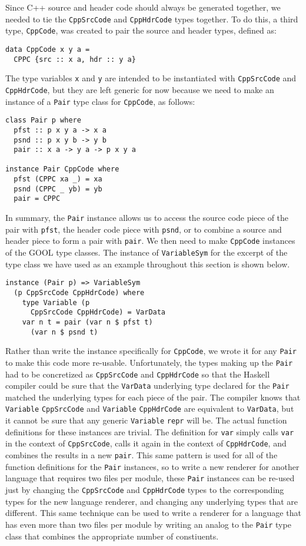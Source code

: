 \documentclass[sigplan,review,anonymous]{acmart}
\begin{document}
Since C++ source and header code should always be generated together, we needed 
to tie the \verb|CppSrcCode| and \verb|CppHdrCode| types together. To do this, 
a third type, \verb|CppCode|, was created to pair the source and header types, 
defined as:
\begin{lstlisting}
data CppCode x y a = 
  CPPC {src :: x a, hdr :: y a}
\end{lstlisting}
The type variables \verb|x| and \verb|y| are intended to be instantiated with 
\verb|CppSrcCode| and \verb|CppHdrCode|, but they are left generic for now 
because we need to make an instance of a \verb|Pair| type class for 
\verb|CppCode|, as follows:
\begin{lstlisting}
class Pair p where
  pfst :: p x y a -> x a
  psnd :: p x y b -> y b
  pair :: x a -> y a -> p x y a
  
instance Pair CppCode where
  pfst (CPPC xa _) = xa
  psnd (CPPC _ yb) = yb
  pair = CPPC
\end{lstlisting}
In summary, the \verb|Pair| instance allows us to access the source code piece 
of the pair with \verb|pfst|, the header code piece with \verb|psnd|, or to 
combine a source and header piece to form a pair with \verb|pair|. We then need 
to make \verb|CppCode| instances of the GOOL type classes. The instance of 
\verb|VariableSym| for the excerpt of the type class we have used as an example 
throughout this section is shown below.
\begin{lstlisting}
instance (Pair p) => VariableSym 
  (p CppSrcCode CppHdrCode) where
    type Variable (p 
      CppSrcCode CppHdrCode) = VarData
    var n t = pair (var n $ pfst t) 
      (var n $ psnd t)
\end{lstlisting}
Rather than write the instance specifically for \verb|CppCode|, we wrote it for 
any \verb|Pair| to make this code more re-usable. Unfortunately, the types 
making up the \verb|Pair| had to be concretized as \verb|CppSrcCode| and 
\verb|CppHdrCode| so that the Haskell compiler could be sure that the 
\verb|VarData| underlying type declared for the \verb|Pair| matched the 
underlying types for each piece of the pair. The compiler knows that 
\verb|Variable| \verb|CppSrcCode| and \verb|Variable| \verb|CppHdrCode| are 
equivalent to \verb|VarData|, but it cannot be sure that any generic 
\verb|Variable| \verb|repr| will be. The actual function definitions for these 
instances are trivial. The definition for \verb|var| simply calls \verb|var| in 
the context of \verb|CppSrcCode|, calls it again in the context of 
\verb|CppHdrCode|, and combines the results in a new \verb|pair|. This same 
pattern is used for all of the function definitions for the \verb|Pair| 
instances, so to write a new renderer for another language that requires two 
files per module, these \verb|Pair| instances can be re-used just by changing 
the \verb|CppSrcCode| and \verb|CppHdrCode| types to the corresponding types 
for the new language renderer, and changing any underlying types that are 
different. This same technique can be used to write a renderer for a language 
that has even more than two files per module by writing an analog to the 
\verb|Pair| type class that combines the appropriate number of constiuents.
\end{document}
